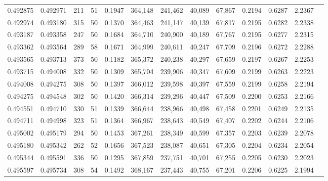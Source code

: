 \begin{tabular}{rrrrrrrrrrrrr}
0.492875 & 0.492971 &   211 &  51 &                                     0.1947 & 364,148 & 241,462 &  40,089 &  67,867 & 0.2194 & 0.6287 & 2.2367 \\
0.492974 & 0.493180 &   315 &  50 &                                     0.1370 & 364,463 & 241,147 &  40,139 &  67,817 & 0.2195 & 0.6282 & 2.2338 \\
0.493187 & 0.493358 &   247 &  50 &                                     0.1684 & 364,710 & 240,900 &  40,189 &  67,767 & 0.2195 & 0.6277 & 2.2315 \\
0.493362 & 0.493564 &   289 &  58 &                                     0.1671 & 364,999 & 240,611 &  40,247 &  67,709 & 0.2196 & 0.6272 & 2.2288 \\
0.493565 & 0.493713 &   373 &  50 &                                     0.1182 & 365,372 & 240,238 &  40,297 &  67,659 & 0.2197 & 0.6267 & 2.2253 \\
0.493715 & 0.494008 &   332 &  50 &                                     0.1309 & 365,704 & 239,906 &  40,347 &  67,609 & 0.2199 & 0.6263 & 2.2223 \\
0.494008 & 0.494275 &   308 &  50 &                                     0.1397 & 366,012 & 239,598 &  40,397 &  67,559 & 0.2199 & 0.6258 & 2.2194 \\
0.494275 & 0.494548 &   302 &  50 &                                     0.1420 & 366,314 & 239,296 &  40,447 &  67,509 & 0.2200 & 0.6253 & 2.2166 \\
0.494551 & 0.494710 &   330 &  51 &                                     0.1339 & 366,644 & 238,966 &  40,498 &  67,458 & 0.2201 & 0.6249 & 2.2135 \\
0.494711 & 0.494998 &   323 &  51 &                                     0.1364 & 366,967 & 238,643 &  40,549 &  67,407 & 0.2202 & 0.6244 & 2.2106 \\
0.495002 & 0.495179 &   294 &  50 &                                     0.1453 & 367,261 & 238,349 &  40,599 &  67,357 & 0.2203 & 0.6239 & 2.2078 \\
0.495180 & 0.495342 &   262 &  52 &                                     0.1656 & 367,523 & 238,087 &  40,651 &  67,305 & 0.2204 & 0.6234 & 2.2054 \\
0.495344 & 0.495591 &   336 &  50 &                                     0.1295 & 367,859 & 237,751 &  40,701 &  67,255 & 0.2205 & 0.6230 & 2.2023 \\
0.495597 & 0.495734 &   308 &  54 &                                     0.1492 & 368,167 & 237,443 &  40,755 &  67,201 & 0.2206 & 0.6225 & 2.1994 \\

\end{tabular}
